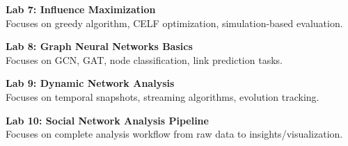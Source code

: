 \vspace{0.2cm}

\noindent\textbf{Lab 7: Influence Maximization} \\
Focuses on greedy algorithm, CELF optimization, simulation-based evaluation.

\vspace{0.2cm}

\noindent\textbf{Lab 8: Graph Neural Networks Basics} \\
Focuses on GCN, GAT, node classification, link prediction tasks.

\vspace{0.2cm}

\noindent\textbf{Lab 9: Dynamic Network Analysis} \\
Focuses on temporal snapshots, streaming algorithms, evolution tracking.

\vspace{0.2cm}

\noindent\textbf{Lab 10: Social Network Analysis Pipeline} \\
Focuses on complete analysis workflow from raw data to insights/visualization.

\vspace{0.2cm}

\newpage
{}

